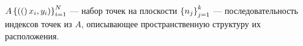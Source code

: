 






 $A \left\{\left((\right)x_i, y_i)\right\}_{i=1}^N$ --- набор точек на плоскости
 $\left\{n_j\right\}_{j=1}^k$ --- последовательность индексов точек из $A$, описывающее пространственную структуру их расположения.



